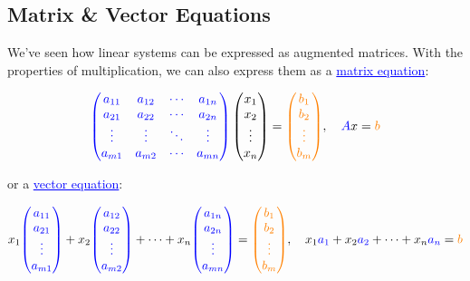 \documentclass{article}
\newcommand{\bul}[1]{\textcolor{blue}{\underline{#1}}}
\begin{document}
\subsection{Matrix \& Vector Equations}
We've seen how linear systems can be expressed as augmented matrices. With the properties of multiplication, we can also express them as a \bul{matrix equation}:

\[
\textcolor{blue}{
\begin{pmatrix}
a_{11} & a_{12} & \cdots & a_{1n} \\
a_{21} & a_{22} & \cdots & a_{2n} \\
\vdots & \vdots & \ddots & \vdots \\
a_{m1} & a_{m2} & \cdots & a_{mn}
\end{pmatrix}
}
\begin{pmatrix}
x_1 \\
x_2 \\
\vdots \\
x_n
\end{pmatrix}
=
\textcolor{orange}{
\begin{pmatrix}
b_1 \\
b_2 \\
\vdots \\
b_m
\end{pmatrix}
},
\quad \textcolor{blue}{A}x = \textcolor{orange}{b}
\]

\vspace{10pt}

or a \bul{vector equation}: 

\[
x_1
\textcolor{blue}{
\begin{pmatrix}
a_{11} \\
a_{21} \\
\vdots \\
a_{m1}
\end{pmatrix}
} + 
x_2
\textcolor{blue}{
\begin{pmatrix}
a_{12} \\
a_{22} \\
\vdots \\
a_{m2}
\end{pmatrix}
} + \cdots + 
x_n
\textcolor{blue}{
\begin{pmatrix}
a_{1n} \\
a_{2n} \\
\vdots \\
a_{mn}
\end{pmatrix}
} =
\textcolor{orange}{
\begin{pmatrix}
b_1 \\
b_2 \\
\vdots \\
b_m
\end{pmatrix}
}, \quad 
x_1 \textcolor{blue}{a_1} + x_2 \textcolor{blue}{a_2} + \cdots + x_n \textcolor{blue}{a_n} = \textcolor{orange}{b}
\]
\end{document}
